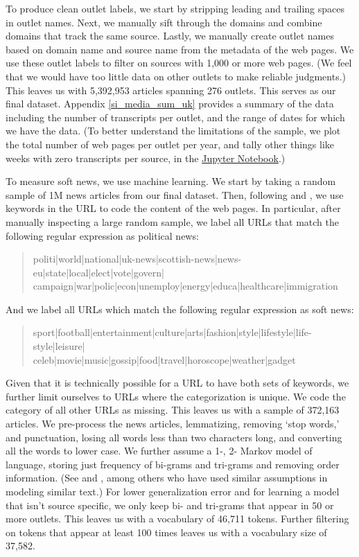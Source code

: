 \documentclass[12pt, letterpaper]{article}
\begin{document}
To produce clean outlet labels, we start by stripping leading and trailing spaces in outlet names. Next, we manually sift through the domains and combine domains that track the same source. Lastly, we manually create outlet names based on domain name and source name from the metadata of the web pages. We use these outlet labels to filter on sources with 1,000 or more web pages. (We feel that we would have too little data on other outlets to make reliable judgments.) This leaves us with 5,392,953 articles spanning 276 outlets. This serves as our final dataset. Appendix \ref{si_media_sum_uk} provides a summary of the data including the number of transcripts per outlet, and the range of dates for which we have the data. (To better understand the limitations of the sample, we plot the total number of web pages per outlet per year, and tally other things like weeks with zero transcripts per source, in the \href{https://github.com/not_news/uk_not_news/blob/master/scripts/01_subset_summarize_uk_news_media_data_by_label.ipynb}{Jupyter Notebook}.)

To measure soft news, we use machine learning.  We start by taking a random sample of 1M news articles from our final dataset. Then, following \citet{bakshy2015exposure} and \citet{flaxman2016filter}, we use keywords in the URL to code the content of the web pages. In particular, after manually inspecting a large random sample, we label all URLs that match the following regular expression as political news:

\begin{quote}
politi|world|national|uk-news|scottish-news|news-eu|state|local|elect|vote|govern|\\
campaign|war|polic|econ|unemploy|energy|educa|healthcare|immigration
\end{quote}

\noindent And we label all URLs which match the following regular expression as soft news: 
\begin{quote}
sport|football|entertainment|culture|arts|fashion|style|lifestyle|life-style|leisure|\\
celeb|movie|music|gossip|food|travel|horoscope|weather|gadget
\end{quote}

Given that it is technically possible for a URL to have both sets of keywords, we further limit ourselves to URLs where the categorization is unique. We code the category of all other URLs as missing. This leaves us with a sample of 372,163 articles. We pre-process the news articles, lemmatizing, removing `stop words,' and punctuation, losing all words less than two characters long, and converting all the words to lower case. We further assume a 1-, 2- Markov model of language, storing just frequency of bi-grams and tri-grams and removing order information. (See \citet{gentzkow2010} and \citet{MartinYurukoglu2014}, among others who have used similar assumptions in modeling similar text.) For lower generalization error and for learning a model that isn't source specific, we only keep bi- and tri-grams that appear in 50 or more outlets. This leaves us with a vocabulary of 46,711 tokens. Further filtering on tokens that appear at least 100 times leaves us with a vocabulary size of 37,582. 
\end{document}
